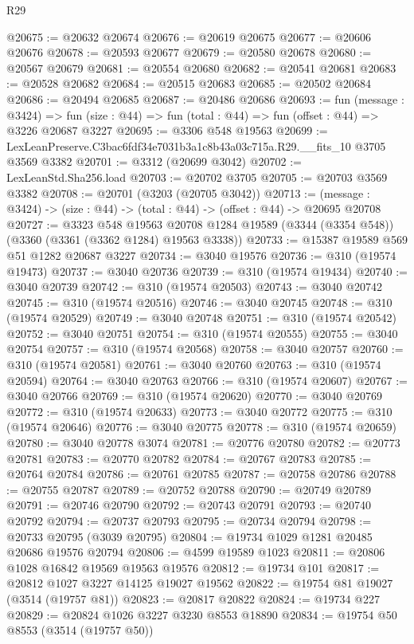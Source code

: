 \begin{lexlean}{R29}
\begin{coremodule}
@20675 := @20632 @20674
@20676 := @20619 @20675
@20677 := @20606 @20676
@20678 := @20593 @20677
@20679 := @20580 @20678
@20680 := @20567 @20679
@20681 := @20554 @20680
@20682 := @20541 @20681
@20683 := @20528 @20682
@20684 := @20515 @20683
@20685 := @20502 @20684
@20686 := @20494 @20685
@20687 := @20486 @20686
@20693 := fun (message : @3424) =>
  fun (size : @44) => fun (total : @44) => fun (offset : @44) => @3226 @20687 @3227
@20695 := @3306 @548 @19563
@20699 := LexLeanPreserve.C3bac6fdf34e7031b3a1c8b43a03c715a.R29.__fits_10 @3705 @3569 @3382
@20701 := @3312 (@20699 @3042)
@20702 := LexLeanStd.Sha256.load
@20703 := @20702 @3705
@20705 := @20703 @3569 @3382
@20708 := @20701 (@3203 (@20705 @3042))
@20713 := (message : @3424) -> (size : @44) -> (total : @44) -> (offset : @44) -> @20695 @20708
@20727 := @3323
    @548
    @19563
    @20708
    @1284
    @19589
    (@3344 (@3354 @548))
    (@3360 (@3361 (@3362 @1284) @19563 @3338))
@20733 := @15387 @19589 @569 @51 @1282 @20687 @3227
@20734 := @3040 @19576
@20736 := @310 (@19574 @19473)
@20737 := @3040 @20736
@20739 := @310 (@19574 @19434)
@20740 := @3040 @20739
@20742 := @310 (@19574 @20503)
@20743 := @3040 @20742
@20745 := @310 (@19574 @20516)
@20746 := @3040 @20745
@20748 := @310 (@19574 @20529)
@20749 := @3040 @20748
@20751 := @310 (@19574 @20542)
@20752 := @3040 @20751
@20754 := @310 (@19574 @20555)
@20755 := @3040 @20754
@20757 := @310 (@19574 @20568)
@20758 := @3040 @20757
@20760 := @310 (@19574 @20581)
@20761 := @3040 @20760
@20763 := @310 (@19574 @20594)
@20764 := @3040 @20763
@20766 := @310 (@19574 @20607)
@20767 := @3040 @20766
@20769 := @310 (@19574 @20620)
@20770 := @3040 @20769
@20772 := @310 (@19574 @20633)
@20773 := @3040 @20772
@20775 := @310 (@19574 @20646)
@20776 := @3040 @20775
@20778 := @310 (@19574 @20659)
@20780 := @3040 @20778 @3074
@20781 := @20776 @20780
@20782 := @20773 @20781
@20783 := @20770 @20782
@20784 := @20767 @20783
@20785 := @20764 @20784
@20786 := @20761 @20785
@20787 := @20758 @20786
@20788 := @20755 @20787
@20789 := @20752 @20788
@20790 := @20749 @20789
@20791 := @20746 @20790
@20792 := @20743 @20791
@20793 := @20740 @20792
@20794 := @20737 @20793
@20795 := @20734 @20794
@20798 := @20733 @20795 (@3039 @20795)
@20804 := @19734 @1029 @1281 @20485 @20686 @19576 @20794
@20806 := @4599 @19589 @1023
@20811 := @20806 @1028 @16842 @19569 @19563 @19576
@20812 := @19734 @101
@20817 := @20812 @1027 @3227 @14125 @19027 @19562
@20822 := @19754 @81 @19027 (@3514 (@19757 @81))
@20823 := @20817 @20822
@20824 := @19734 @227
@20829 := @20824 @1026 @3227 @3230 @8553 @18890
@20834 := @19754 @50 @8553 (@3514 (@19757 @50))

\end{coremodule}
\end{lexlean}
